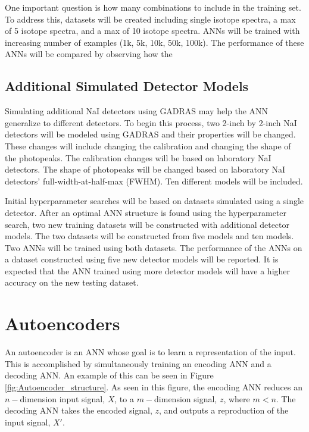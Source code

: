 \documentclass[tocnosub,noragright,centerchapter,12pt,fullpage]{uiucecethesis09}
\begin{document}
One important question is how many combinations to include in the training set. To address this, datasets will be created including single isotope spectra, a max of 5 isotope spectra, and a max of 10 isotope spectra. ANNs will be trained with increasing number of examples (1k, 5k, 10k, 50k, 100k). The performance of these ANNs will be compared by observing how the 

\fi

\subsection{Additional Simulated Detector Models}

Simulating additional NaI detectors using GADRAS may help the ANN generalize to different detectors. To begin this process, two 2-inch by 2-inch NaI detectors will be modeled using GADRAS and their properties will be changed. These changes will include changing the calibration and changing the shape of the photopeaks. The calibration changes will be based on laboratory NaI detectors. The shape of photopeaks will be changed based on laboratory NaI detectors' full-width-at-half-max (FWHM). Ten different models will be included. 

Initial hyperparameter searches will be based on datasets simulated using a single detector. After an optimal ANN structure is found using the hyperparameter search, two new training datasets will be constructed with additional detector models. The two datasets will be constructed from five models and ten models. Two ANNs will be trained using both datasets. The performance of the ANNs on a dataset constructed using five new detector models will be reported. It is expected that the ANN trained using more detector models will have a higher accuracy on the new testing dataset. 


\section{Autoencoders} \label{Autoencoders}


An autoencoder is an ANN whose goal is to learn a representation of the input. This is accomplished by simultaneously training an encoding ANN and a decoding ANN. An example of this can be seen in Figure \ref{fig:Autoencoder_structure}. As seen in this figure, the encoding ANN reduces an $n-$dimension input signal, $X$, to a $m-$dimension signal, $z$, where $m < n$. The decoding ANN takes the encoded signal, $z$, and outputs a reproduction of the input signal, $X'$.
\end{document}

